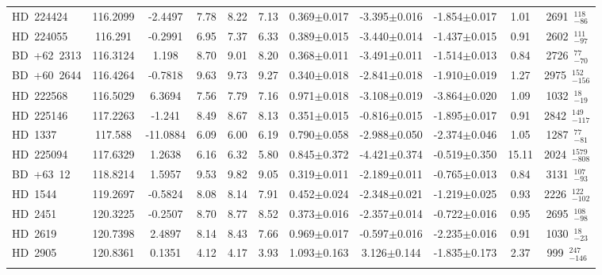 {\begin{longtable}{lcccccccccc}
\noalign{\smallskip}
HD~224424 & 116.2099 & -2.4497 & 7.78 & 8.22 & 7.13 & 0.369$\pm$0.017 & -3.395$\pm$0.016 & -1.854$\pm$0.017 & 1.01 & 2691~$_{-86}^{118}$ \\
\noalign{\smallskip}
HD~224055 & 116.291 & -0.2991 & 6.95 & 7.37 & 6.33 & 0.389$\pm$0.015 & -3.440$\pm$0.014 & -1.437$\pm$0.015 & 0.91 & 2602~$_{-97}^{111}$ \\
\noalign{\smallskip}
BD~+62~2313 & 116.3124 & 1.198 & 8.70 & 9.01 & 8.20 & 0.368$\pm$0.011 & -3.491$\pm$0.011 & -1.514$\pm$0.013 & 0.84 & 2726~$_{-70}^{77}$ \\
\noalign{\smallskip}
BD~+60~2644 & 116.4264 & -0.7818 & 9.63 & 9.73 & 9.27 & 0.340$\pm$0.018 & -2.841$\pm$0.018 & -1.910$\pm$0.019 & 1.27 & 2975~$_{-156}^{152}$ \\
\noalign{\smallskip}
HD~222568 & 116.5029 & 6.3694 & 7.56 & 7.79 & 7.16 & 0.971$\pm$0.018 & -3.108$\pm$0.019 & -3.864$\pm$0.020 & 1.09 & 1032~$_{-19}^{18}$ \\
\noalign{\smallskip}
HD~225146 & 117.2263 & -1.241 & 8.49 & 8.67 & 8.13 & 0.351$\pm$0.015 & -0.816$\pm$0.015 & -1.895$\pm$0.017 & 0.91 & 2842~$_{-117}^{149}$ \\
\noalign{\smallskip}
HD~1337 & 117.588 & -11.0884 & 6.09 & 6.00 & 6.19 & 0.790$\pm$0.058 & -2.988$\pm$0.050 & -2.374$\pm$0.046 & 1.05 & 1287~$_{-81}^{77}$ \\
\noalign{\smallskip}
HD~225094 & 117.6329 & 1.2638 & 6.16 & 6.32 & 5.80 & 0.845$\pm$0.372 & -4.421$\pm$0.374 & -0.519$\pm$0.350 & 15.11 & 2024~$_{-808}^{1579}$ \\
\noalign{\smallskip}
BD~+63~12 & 118.8214 & 1.5957 & 9.53 & 9.82 & 9.05 & 0.319$\pm$0.011 & -2.189$\pm$0.011 & -0.765$\pm$0.013 & 0.84 & 3131~$_{-93}^{107}$ \\
\noalign{\smallskip}
HD~1544 & 119.2697 & -0.5824 & 8.08 & 8.14 & 7.91 & 0.452$\pm$0.024 & -2.348$\pm$0.021 & -1.219$\pm$0.025 & 0.93 & 2226~$_{-102}^{122}$ \\
\noalign{\smallskip}
HD~2451 & 120.3225 & -0.2507 & 8.70 & 8.77 & 8.52 & 0.373$\pm$0.016 & -2.357$\pm$0.014 & -0.722$\pm$0.016 & 0.95 & 2695~$_{-98}^{108}$ \\
\noalign{\smallskip}
HD~2619 & 120.7398 & 2.4897 & 8.14 & 8.43 & 7.66 & 0.969$\pm$0.017 & -0.597$\pm$0.016 & -2.235$\pm$0.016 & 0.91 & 1030~$_{-23}^{18}$ \\
\noalign{\smallskip}
HD~2905 & 120.8361 & 0.1351 & 4.12 & 4.17 & 3.93 & 1.093$\pm$0.163 & 3.126$\pm$0.144 & -1.835$\pm$0.173 & 2.37 & 999~$_{-146}^{247}$ \\
\noalign{\smallskip}

\end{longtable}}
